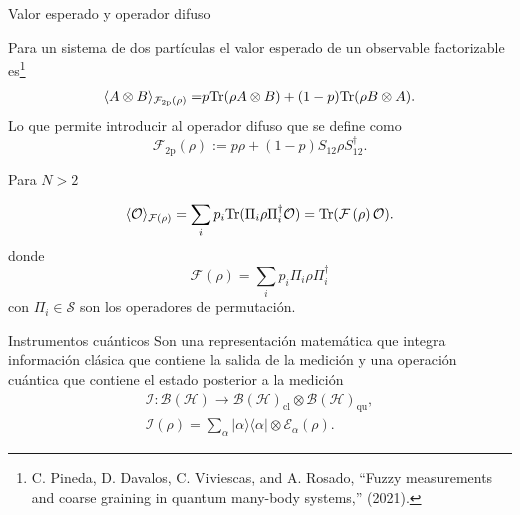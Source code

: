 \documentclass[svgnames,12pt,aspectratio=149]{beamer}
\newcommand{\ra}{\rangle}
\newcommand{\la}{\langle}
\newcommand{\rala}{\rangle\langle}
\newcommand{\tr}{{\rm Tr}}
\newcommand{\E}{\mathcal{E}}
\newcommand{\tensor}{\otimes}
\newcommand{\fuzzy}[1]{\mathcal{F}\left(#1\right)}
\newcommand{\permut}[2]{\Pi_{#1}#2\Pi_{#1}^{\dagger}}
\begin{document}
\begin{frame}{Valor esperado y operador difuso}

 
Para un sistema de dos partículas el valor esperado de un observable factorizable es\footnote{C. Pineda, D. Davalos, C. Viviescas, and A. Rosado, ``Fuzzy measurements and coarse graining in quantum many-body systems,'' (2021).} 
\begin{equation*}\label{eq:Expected-Value-FM-2p}
    \begin{split}
      \la {A\otimes B}\ra_{\mathcal{F}_{2\text{p}}(\rho)} =&p\tr(\rho A\tensor B)+(1-p)\tr(\rho B\otimes A).\\
    \end{split}
\end{equation*}Lo que permite introducir al operador difuso que se define como \begin{equation*}\label{eq:op_F2p}
    \mathcal{F}_{2\text{p}}(\rho):=p\rho + (1-p)S_{12}\rho S_{12}^{\dagger}.
\end{equation*}


\end{frame}

\begin{frame}{Para $N>2$}

\begin{equation*}\label{eq:expected-value-fm-general}
    \la \mathcal{O}\ra_{\fuzzy{\rho}}=\sum_{i}p_i\tr(\permut{i}{\rho}\mathcal{O}) =\tr(\fuzzy{\rho}\mathcal{O}).
\end{equation*} donde \begin{equation*}\label{eq:fuzzy-op-nparticles}
    \fuzzy{\rho}=\sum_{i}p_{i}\permut{i}{\rho}
 \end{equation*} con $\Pi_i \in \mathcal{S}$ son los operadores de permutación.

\end{frame}

\begin{frame}{Instrumentos cuánticos}
  Son una representación matemática que integra información clásica que contiene la salida de la medición y una operación cuántica que contiene el estado posterior a la medición \begin{equation*}
    \begin{split}
        \mathcal{I}: \mathcal{B(H)}\rightarrow\mathcal{B(H)}_{\text{cl}}\otimes \mathcal{B(H)}_{\text{qu}},\\
    \mathcal{I}(\rho)=\sum_\alpha |\alpha\rala\alpha|\otimes \E_\alpha(\rho).
    \end{split}
\end{equation*}
\end{frame}
\end{document}
